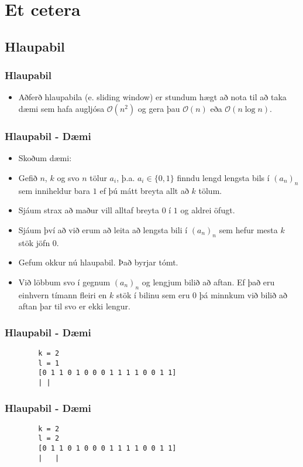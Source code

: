 \documentclass{beamer}
\begin{document}
\section[Et cetera]{Et cetera}
\subsection{Hlaupabil}

\begin{frame}
	\frametitle{Hlaupabil}
	\begin{itemize}
			\item<1-> Aðferð hlaupabila (e. sliding window) er stundum hægt að nota til að taka
				dæmi sem hafa augljósa $\mathcal{O}(n^2)$ og gera þau $\mathcal{O}(n)$ eða $\mathcal{O}(n\log n)$.
	\end{itemize}
\end{frame}

\begin{frame}
	\frametitle{Hlaupabil - Dæmi}
	\begin{itemize}
			\item<1-> Skoðum dæmi:
			\item<2-> Gefið $n$, $k$ og svo $n$ tölur $a_i$, þ.a. $a_i \in \{0, 1\}$ finndu
				lengd lengsta bils í $(a_n)_n$ sem inniheldur bara $1$ ef þú mátt breyta allt að $k$ tölum.
			\item<3-> Sjáum strax að maður vill alltaf breyta $0$ í $1$ og aldrei öfugt.
			\item<4-> Sjáum því að við erum að leita að lengsta bili í $(a_n)_n$ sem hefur mesta
				$k$ stök jöfn $0$.
			\item<5-> Gefum okkur nú hlaupabil. Það byrjar tómt.
			\item<6-> Við löbbum svo í gegnum $(a_n)_n$ og lengjum bilið að aftan. Ef það eru einhvern tímann
				fleiri en $k$ stök í bilinu sem eru $0$ þá minnkum við bilið að aftan þar til svo er ekki lengur.
		\end{itemize}
\end{frame}

\begin{frame}[fragile]
	\frametitle{Hlaupabil - Dæmi}
\begin{verbatim}
        k = 2
        l = 1
        [0 1 1 0 1 0 0 0 1 1 1 1 0 0 1 1]
        | |
\end{verbatim}
\end{frame}
\addtocounter{framenumber}{-1}

\begin{frame}[fragile]
	\frametitle{Hlaupabil - Dæmi}
\begin{verbatim}
        k = 2
        l = 2
        [0 1 1 0 1 0 0 0 1 1 1 1 0 0 1 1]
        |   |
\end{verbatim}
\end{frame}
\addtocounter{framenumber}{-1}
\end{document}
